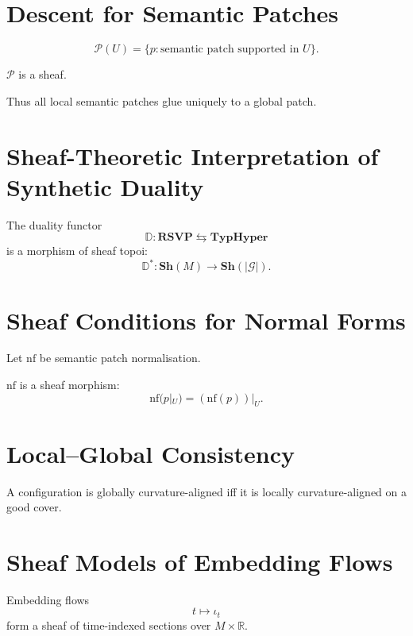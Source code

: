 \section{Descent for Semantic Patches}

\begin{definition}
\[
\mathcal{P}(U) = \{ p: \text{semantic patch supported in } U\}.
\]
\end{definition}

\begin{proposition}
$\mathcal{P}$ is a sheaf.
\end{proposition}

Thus all local semantic patches glue uniquely to a global patch.

\section{Sheaf-Theoretic Interpretation of Synthetic Duality}

The duality functor  
\[
\mathbb{D}: \mathbf{RSVP} \leftrightarrows \mathbf{TypHyper}
\]
is a morphism of sheaf topoi:
\[
\mathbb{D}^\ast : \mathbf{Sh}(M) \to \mathbf{Sh}(|\mathcal{G}|).
\]

\section{Sheaf Conditions for Normal Forms}

Let $\mathrm{nf}$ be semantic patch normalisation.

\begin{proposition}
$\mathrm{nf}$ is a sheaf morphism:
\[
\mathrm{nf}(p|_U) = (\mathrm{nf}(p))|_U.
\]
\end{proposition}

\section{Local–Global Consistency}

A configuration is globally curvature-aligned iff it is locally curvature-aligned on a good cover.

\section{Sheaf Models of Embedding Flows}

Embedding flows
\[
t\mapsto \iota_t
\]
form a sheaf of time-indexed sections over $M\times\mathbb{R}$.

